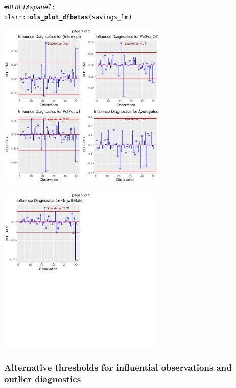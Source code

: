 \documentclass{article}\usepackage[]{graphicx}\usepackage[]{color}
\makeatletter
\newcommand{\hlcom}[1]{\textcolor[rgb]{0.678,0.584,0.686}{\textit{#1}}}%
\newcommand{\hlopt}[1]{\textcolor[rgb]{0,0,0}{#1}}%
\newcommand{\hlstd}[1]{\textcolor[rgb]{0.345,0.345,0.345}{#1}}%
\newcommand{\hlkwd}[1]{\textcolor[rgb]{0.737,0.353,0.396}{\textbf{#1}}}%
\newenvironment{kframe}{%
 \def\at@end@of@kframe{}%
 \ifinner\ifhmode%
  \def\at@end@of@kframe{\end{minipage}}%
  \begin{minipage}{\columnwidth}%
 \fi\fi%
 \def\FrameCommand##1{\hskip\@totalleftmargin \hskip-\fboxsep
 \colorbox{shadecolor}{##1}\hskip-\fboxsep
     \hskip-\linewidth \hskip-\@totalleftmargin \hskip\columnwidth}%
 \MakeFramed {\advance\hsize-\width
   \@totalleftmargin\z@ \linewidth\hsize
   \@setminipage}}%
 {\par\unskip\endMakeFramed%
 \at@end@of@kframe}
\newenvironment{knitrout}{}{} %
\makeatother
\begin{document}
\begin{knitrout}
\color{fgcolor}\begin{kframe}
\begin{alltt}
\hlcom{# DFBETAs panel:}
\hlstd{olsrr}\hlopt{::}\hlkwd{ols_plot_dfbetas}\hlstd{(savings_lm)}
\end{alltt}
\end{kframe}

{\centering \includegraphics[width=0.6\textwidth]{figure/unnamed-chunk-5-1} 

}




{\centering \includegraphics[width=0.6\textwidth]{figure/unnamed-chunk-5-2} 

}



\end{knitrout}

\newpage

\subsubsection*{Alternative thresholds for influential observations and outlier diagnostics}
\end{document}
